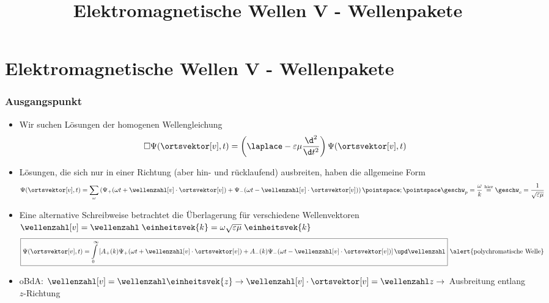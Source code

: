 
  
\title[TET: Elektromagnetische Wellen V - Wellenpakete]{Elektromagnetische Wellen V - Wellenpakete}


% 
% 

\maketitle

% 
% 
\section{Elektromagnetische Wellen V - Wellenpakete}

\begin{frame}
  \frametitle{Ausgangspunkt}
  \begin{itemize}[<+->]
  \item Wir suchen Lösungen der homogenen Wellengleichung
    \begin{equation*}
      \square \Psi(\ortsvektor[v], t) = \left(\laplace - \varepsilon\mu\frac{\d^2}{\d t^2}  \right) \Psi(\ortsvektor[v], t)
    \end{equation*}
  \item Lösungen, die sich nur in einer Richtung (aber hin- und rücklaufend) ausbreiten, haben die allgemeine Form
    \begin{equation*}
      \Psi (\ortsvektor[v], t) = \sum_\omega \left( \Psi_+ (\omega t + \wellenzahl[v]\cdot\ortsvektor[v]) + \Psi_- (\omega t - \wellenzahl[v]\cdot\ortsvektor[v]) \right) \pointspace ; \pointspace \geschw_p =\frac{\omega}{k} \stackrel{\text{hier}}{=} \geschw_c = \frac{1}{\sqrt{\varepsilon\mu}}  
    \end{equation*}
  \item Eine alternative Schreibweise betrachtet die Überlagerung für verschiedene Wellenvektoren \(\wellenzahl[v] = \wellenzahl\; \einheitsvek{k} = \omega\sqrt{\varepsilon\mu}\;\einheitsvek{k}\)
    \begin{equation*}
      \boxed{\Psi (\ortsvektor[v], t) = \int\limits_{0}^\infty \left[ A_+(k) \Psi_+ (\omega t + \wellenzahl[v]\cdot\ortsvektor[v]) + A_-(k) \Psi_- (\omega t - \wellenzahl[v]\cdot\ortsvektor[v]) \right] \upd \wellenzahl} \text{ \alert{polychromatische Welle}} 
    \end{equation*}
    \item oBdA: \(\wellenzahl[v] = \wellenzahl \einheitsvek{z}   \to \wellenzahl[v]\cdot\ortsvektor[v] = \wellenzahl z \to\) Ausbreitung entlang \(z\)-Richtung
\end{itemize}
  \end{frame}

